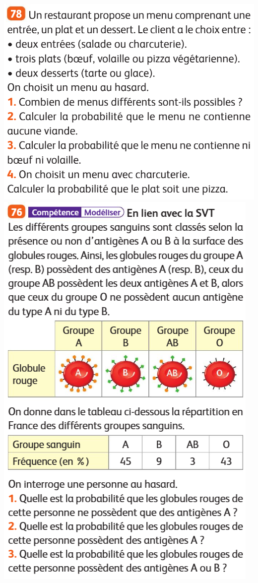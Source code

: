 \documentclass{article}
\begin{document}
\begin{center}
\begin{minipage}{0.40\textwidth}
\end{minipage}
\hfill\vline\hfill
\begin{minipage}{0.40\textwidth}
\includegraphics[width=\textwidth]{Exercice_1.png}
\includegraphics[width=\textwidth]{Exercice_4.png}

\end{minipage}
\end{center}
\end{document}
